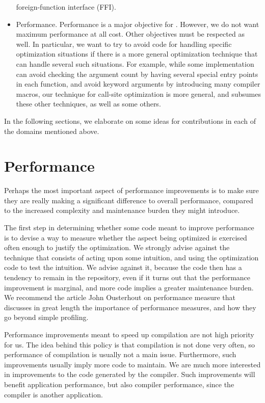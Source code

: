 \begin{itemize}
  foreign-function interface (FFI).
\item Performance.  Performance is a major objective for \sysname{}.
  However, we do not want maximum performance at all cost.  Other
  objectives must be respected as well.  In particular, we want to try
  to avoid code for handling specific optimization situations if there
  is a more general optimization technique that can handle several
  such situations.  For example, while some \commonlisp{}
  implementation can avoid checking the argument count by having
  several special entry points in each function, and avoid keyword
  arguments by introducing many compiler macros, our technique for
  call-site optimization is more general, and subsumes these other
  techniques, as well as some others.
\end{itemize}

In the following sections, we elaborate on some ideas for
contributions in each of the domains mentioned above.

\section{Performance}

Perhaps the most important aspect of performance improvements is to
make sure they are really making a significant difference to overall
performance, compared to the increased complexity and maintenance
burden they might introduce.

The first step in determining whether some code meant to improve
performance is to devise a way to measure whether the aspect being
optimized is exercised often enough to justify the optimization.  We
strongly advise against the technique that consists of acting upon
some intuition, and using the optimization code to test the
intuition.  We advise against it, because the code then has a tendency
to remain in the repository, even if it turns out that the performance
improvement is marginal, and more code implies a greater maintenance
burden.  We recommend the article \cite{10.1145/3213770}
John Ousterhout on performance measure that discusses in great length
the importance of performance measures, and how they go beyond simple
profiling.

Performance improvements meant to speed up compilation are not high
priority for us.  The idea behind this policy is that compilation is
not done very often, so performance of compilation is usually not a
main issue.  Furthermore, such improvements usually imply more code to
maintain.  We are much more interested in improvements to the code
generated by the compiler.  Such improvements will benefit application
performance, but also compiler performance, since the compiler is
another application.

